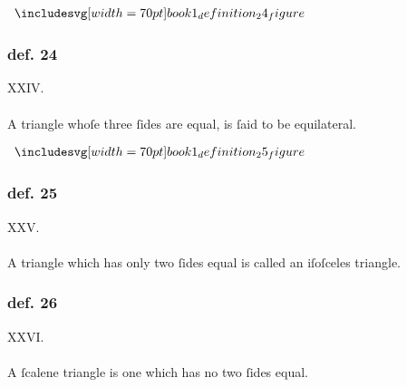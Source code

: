\hfill

\begin{minipage}{0.33\textwidth}
    \begin{center}
        $\img[0][0][70]{book1_definition_24_figure}$
    \end{center}
\end{minipage}%
\begin{minipage}{0.67\textwidth}
    \subsubsection{def. 24}
    \begin{center}
        XXIV.\label{book1def24}\\
        \hfill\\
        A triangle whoſe three ſides are equal, is ſaid to be equilateral.
    \end{center}
\end{minipage}

\hfill

\begin{minipage}{0.33\textwidth}
    \begin{center}
        $\img[0][0][70]{book1_definition_25_figure}$
    \end{center}
\end{minipage}%
\begin{minipage}{0.67\textwidth}
    \subsubsection{def. 25}
    \begin{center}
        XXV.\label{book1def25}\\
        \hfill\\
        A triangle which has only two ſides equal is called an iſoſceles \mbox{triangle}.
    \end{center}
\end{minipage}

\hfill

\begin{minipage}{0.33\textwidth}
    \phantom{}
\end{minipage}%
\begin{minipage}{0.67\textwidth}
    \subsubsection{def. 26}
    \begin{center}
        XXVI.\label{book1def26}\\
        \hfill\\
        A ſcalene triangle is one which has no two ſides equal.\\
    \end{center}
\end{minipage}

